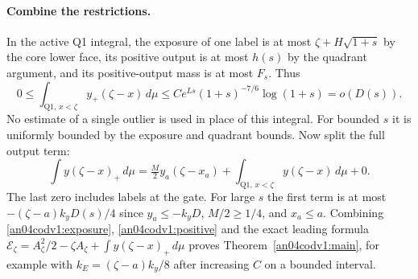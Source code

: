 \documentclass[11pt]{article}
\newcommand{\dd}{\,d}
\begin{document}
\paragraph{Combine the restrictions.}
In the active Q1 integral, the exposure of one label is at most
$\zeta+H\sqrt{1+s}$ by the core lower face, its positive output
is at most $h(s)$ by the quadrant argument, and its positive-output
mass is at most $F_s$. Thus
\begin{equation}\label{an04codv1:positive}
 0\le\int_{\mathrm{Q1},\,x<\zeta} y_+(\zeta-x)\dd\mu
 \le C e^{Ls}(1+s)^{-7/6}\log(1+s)=o(D(s)).
\end{equation}
No estimate of a single outlier is used in place of this integral.
For bounded $s$ it is uniformly bounded by the exposure and quadrant
bounds. Now split the full output term:
\[
 \int y(\zeta-x)_+\dd\mu
 =\tfrac M2 y_a(\zeta-x_a)
 +\int_{\mathrm{Q1},\,x<\zeta} y(\zeta-x)\dd\mu+0 .
\]
The last zero includes labels at the gate. For large $s$ the first
term is at most $-(\zeta-a)k_yD(s)/4$ since $y_a\le-k_yD$,
$M/2\ge1/4$, and $x_a\le a$. Combining \eqref{an04codv1:exposure},
\eqref{an04codv1:positive} and the exact leading formula
$\mathcal E_\zeta=A_\zeta^2/2-\zeta A_\zeta+\int y(\zeta-x)_+\dd\mu$
proves Theorem~\ref{an04codv1:main}, for example with
$k_E=(\zeta-a)k_y/8$ after increasing $C$ on a bounded interval.
\end{document}

